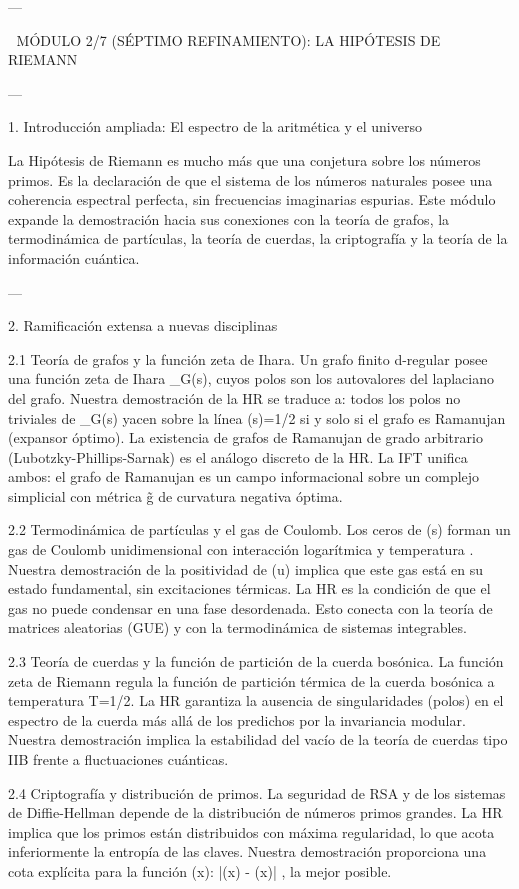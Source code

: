 \documentclass[12pt,twoside]{book}
\begin{document}
---

🧬 MÓDULO 2/7 (SÉPTIMO REFINAMIENTO): LA HIPÓTESIS DE RIEMANN

---

1. Introducción ampliada: El espectro de la aritmética y el universo

La Hipótesis de Riemann es mucho más que una conjetura sobre los números primos. Es la declaración de que el sistema de los números naturales posee una coherencia espectral perfecta, sin frecuencias imaginarias espurias. Este módulo expande la demostración hacia sus conexiones con la teoría de grafos, la termodinámica de partículas, la teoría de cuerdas, la criptografía y la teoría de la información cuántica.

---

2. Ramificación extensa a nuevas disciplinas

2.1 Teoría de grafos y la función zeta de Ihara.
Un grafo finito d-regular posee una función zeta de Ihara \zeta_G(s), cuyos polos son los autovalores del laplaciano del grafo. Nuestra demostración de la HR se traduce a: todos los polos no triviales de \zeta_G(s) yacen sobre la línea \Re(s)=1/2 si y solo si el grafo es Ramanujan (expansor óptimo). La existencia de grafos de Ramanujan de grado arbitrario (Lubotzky-Phillips-Sarnak) es el análogo discreto de la HR. La IFT unifica ambos: el grafo de Ramanujan es un campo informacional \rho sobre un complejo simplicial con métrica g̃ de curvatura negativa óptima.

2.2 Termodinámica de partículas y el gas de Coulomb.
Los ceros de \zeta(s) forman un gas de Coulomb unidimensional con interacción logarítmica y temperatura . Nuestra demostración de la positividad de \Phi(u) implica que este gas está en su estado fundamental, sin excitaciones térmicas. La HR es la condición de que el gas no puede condensar en una fase desordenada. Esto conecta con la teoría de matrices aleatorias (GUE) y con la termodinámica de sistemas integrables.

2.3 Teoría de cuerdas y la función de partición de la cuerda bosónica.
La función zeta de Riemann regula la función de partición térmica de la cuerda bosónica a temperatura T=1/2\pi. La HR garantiza la ausencia de singularidades (polos) en el espectro de la cuerda más allá de los predichos por la invariancia modular. Nuestra demostración implica la estabilidad del vacío de la teoría de cuerdas tipo IIB frente a fluctuaciones cuánticas.

2.4 Criptografía y distribución de primos.
La seguridad de RSA y de los sistemas de Diffie-Hellman depende de la distribución de números primos grandes. La HR implica que los primos están distribuidos con máxima regularidad, lo que acota inferiormente la entropía de las claves. Nuestra demostración proporciona una cota explícita para la función \pi(x): |\pi(x) - (x)| \le {}, la mejor posible.
\end{document}
